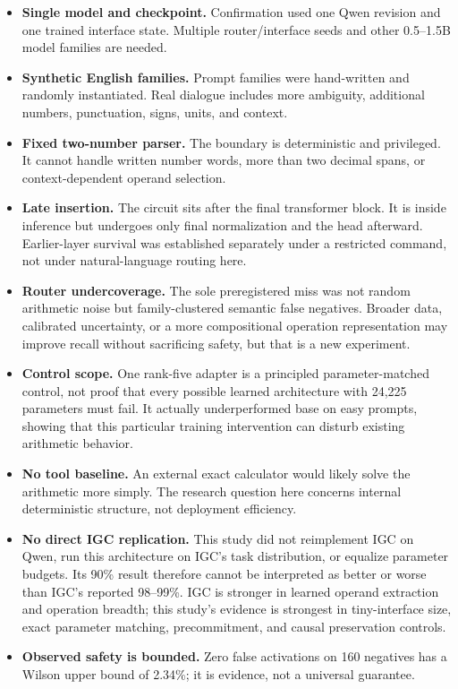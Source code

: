 \documentclass[11pt]{article}
\begin{document}
\begin{itemize}
  \item \textbf{Single model and checkpoint.} Confirmation used one Qwen
  revision and one trained interface state. Multiple router/interface seeds
  and other 0.5--1.5B model families are needed.
  \item \textbf{Synthetic English families.} Prompt families were
  hand-written and randomly instantiated. Real dialogue includes more
  ambiguity, additional numbers, punctuation, signs, units, and context.
  \item \textbf{Fixed two-number parser.} The boundary is deterministic and
  privileged. It cannot handle written number words, more than two decimal
  spans, or context-dependent operand selection.
  \item \textbf{Late insertion.} The circuit sits after the final transformer
  block. It is inside inference but undergoes only final normalization and the
  head afterward. Earlier-layer survival was established separately under a
  restricted command, not under natural-language routing here.
  \item \textbf{Router undercoverage.} The sole preregistered miss was not
  random arithmetic noise but family-clustered semantic false negatives.
  Broader data, calibrated uncertainty, or a more compositional operation
  representation may improve recall without sacrificing safety, but that is a
  new experiment.
  \item \textbf{Control scope.} One rank-five adapter is a principled
  parameter-matched control, not proof that every possible learned
  architecture with 24,225 parameters must fail. It actually underperformed
  base on easy prompts, showing that this particular training intervention can
  disturb existing arithmetic behavior.
  \item \textbf{No tool baseline.} An external exact calculator would likely
  solve the arithmetic more simply. The research question here concerns
  internal deterministic structure, not deployment efficiency.
  \item \textbf{No direct IGC replication.} This study did not reimplement IGC
  on Qwen, run this architecture on IGC's task distribution, or equalize
  parameter budgets. Its 90\% result therefore cannot be interpreted as better
  or worse than IGC's reported 98--99\%. IGC is stronger in learned operand
  extraction and operation breadth; this study's evidence is strongest in
  tiny-interface size, exact parameter matching, precommitment, and causal
  preservation controls.
  \item \textbf{Observed safety is bounded.} Zero false activations on 160
  negatives has a Wilson upper bound of 2.34\%; it is evidence, not a universal
  guarantee.
\end{itemize}
\end{document}
